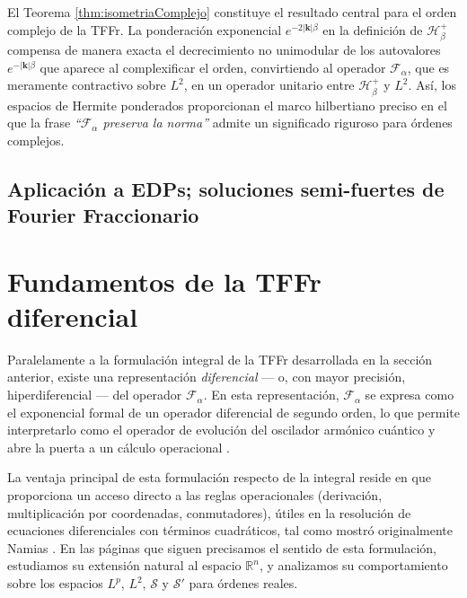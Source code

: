             \begin{remark}\label{rmk:sintesis}
                El Teorema \ref{thm:isometriaComplejo} constituye el resultado central para el orden complejo de la TFFr. La ponderación exponencial $e^{-2|\boldsymbol{k}|\beta}$ en la definición de $\mathcal{H}_\beta^+$ compensa de manera exacta el decrecimiento no unimodular de los autovalores $e^{-|\boldsymbol{k}|\beta}$ que aparece al complexificar el orden, convirtiendo al operador $\mathcal{F}_\alpha$, que es meramente contractivo sobre $L^2$, en un operador unitario entre $\mathcal{H}_\beta^+$ y $L^2$. Así, los espacios de Hermite ponderados proporcionan el marco hilbertiano preciso en el que la frase \emph{``$\mathcal{F}_\alpha$ preserva la norma''} admite un significado riguroso para órdenes complejos.
            \end{remark}

       \subsection{Aplicación a EDPs; soluciones semi-fuertes de Fourier Fraccionario}

    \section{Fundamentos de la TFFr diferencial}
       
       Paralelamente a la formulación integral de la TFFr desarrollada en la sección anterior, existe una representación \emph{diferencial} --- o, con mayor precisión, hiperdiferencial --- del operador $\mathcal{F}_\alpha$. En esta representación, $\mathcal{F}_\alpha$ se expresa como el exponencial formal de un operador diferencial de segundo orden, lo que permite interpretarlo como el operador de evolución del oscilador armónico cuántico y abre la puerta a un cálculo operacional \citep{namias1980fractional,mcbride1987namias,kutay2002fractional}.

       La ventaja principal de esta formulación respecto de la integral reside en que proporciona un acceso directo a las reglas operacionales (derivación, multiplicación por coordenadas, conmutadores), útiles en la resolución de ecuaciones diferenciales con términos cuadráticos, tal como mostró originalmente Namias \citep{namias1980fractional}. En las páginas que siguen precisamos el sentido de esta formulación, estudiamos su extensión natural al espacio $\mathbb{R}^n$, y analizamos su comportamiento sobre los espacios $L^p$, $L^2$, $\mathcal{S}$ y $\mathcal{S}'$ para órdenes reales.

